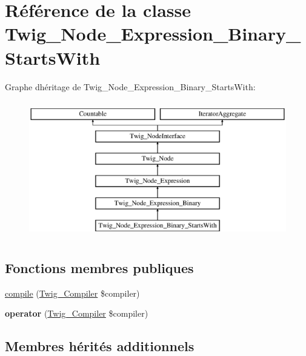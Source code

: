 \hypertarget{class_twig___node___expression___binary___starts_with}{}\section{Référence de la classe Twig\+\_\+\+Node\+\_\+\+Expression\+\_\+\+Binary\+\_\+\+Starts\+With}
\label{class_twig___node___expression___binary___starts_with}
Graphe d\textquotesingle{}héritage de Twig\+\_\+\+Node\+\_\+\+Expression\+\_\+\+Binary\+\_\+\+Starts\+With\+:\begin{figure}[H]
\begin{center}
\leavevmode
\includegraphics[height=6.000000cm]{class_twig___node___expression___binary___starts_with}
\end{center}
\end{figure}
\subsection*{Fonctions membres publiques}
\begin{DoxyCompactItemize}
\item 
\hyperlink{class_twig___node___expression___binary___starts_with_a4e0faa87c3fae583620b84d3607085da}{compile} (\hyperlink{class_twig___compiler}{Twig\+\_\+\+Compiler} \$compiler)
\item 
{\bfseries operator} (\hyperlink{class_twig___compiler}{Twig\+\_\+\+Compiler} \$compiler)\hypertarget{class_twig___node___expression___binary___starts_with_af77318ec88d5f8a508684970a150b670}{}\label{class_twig___node___expression___binary___starts_with_af77318ec88d5f8a508684970a150b670}

\end{DoxyCompactItemize}
\subsection*{Membres hérités additionnels}


